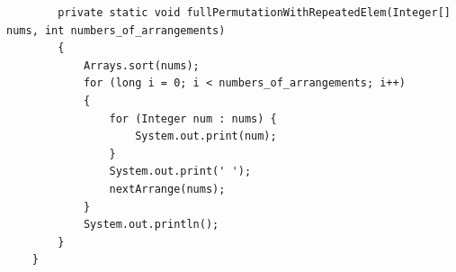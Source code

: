 \documentclass[11pt]{homework}
\begin{document}
\begin{lstlisting}
        private static void fullPermutationWithRepeatedElem(Integer[] nums, int numbers_of_arrangements)
        {
            Arrays.sort(nums);
            for (long i = 0; i < numbers_of_arrangements; i++)
            {
                for (Integer num : nums) {
                    System.out.print(num);
                }
                System.out.print(' ');
                nextArrange(nums);
            }
            System.out.println();
        }
    }
  \end{lstlisting}
\end{document}
